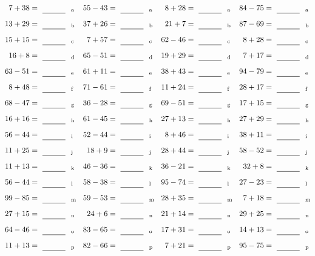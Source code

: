\documentclass
[
  draft    = true,
  fontsize = 11pt,
  parskip  = half-
]
{scrartcl}
\begin{document}
\clearpage
\begin{align*}
    \pline{7+38}&=\rline{a}
  & \pline{55-43}&=\rline{a}
  & \pline{8+28}&=\rline{a}
  & \pline{84-75}&=\rline{a} \\[1ex]
    \pline{13+29}&=\rline{b}
  & \pline{37+26}&=\rline{b}
  & \pline{21+7}&=\rline{b}
  & \pline{87-69}&=\rline{b} \\[1ex]
    \pline{15+15}&=\rline{c}
  & \pline{7+57}&=\rline{c}
  & \pline{62-46}&=\rline{c}
  & \pline{8+28}&=\rline{c} \\[1ex]
    \pline{16+8}&=\rline{d}
  & \pline{65-51}&=\rline{d}
  & \pline{19+29}&=\rline{d}
  & \pline{7+17}&=\rline{d} \\[1ex]
    \pline{63-51}&=\rline{e}
  & \pline{61+11}&=\rline{e}
  & \pline{38+43}&=\rline{e}
  & \pline{94-79}&=\rline{e} \\[1ex]
    \pline{8+48}&=\rline{f}
  & \pline{71-61}&=\rline{f}
  & \pline{11+24}&=\rline{f}
  & \pline{28+17}&=\rline{f} \\[1ex]
    \pline{68-47}&=\rline{g}
  & \pline{36-28}&=\rline{g}
  & \pline{69-51}&=\rline{g}
  & \pline{17+15}&=\rline{g} \\[1ex]
    \pline{16+16}&=\rline{h}
  & \pline{61-45}&=\rline{h}
  & \pline{27+13}&=\rline{h}
  & \pline{27+29}&=\rline{h} \\[1ex]
    \pline{56-44}&=\rline{i}
  & \pline{52-44}&=\rline{i}
  & \pline{8+46}&=\rline{i}
  & \pline{38+11}&=\rline{i} \\[1ex]
    \pline{11+25}&=\rline{j}
  & \pline{18+9}&=\rline{j}
  & \pline{28+44}&=\rline{j}
  & \pline{58-52}&=\rline{j} \\[1ex]
    \pline{11+13}&=\rline{k}
  & \pline{46-36}&=\rline{k}
  & \pline{36-21}&=\rline{k}
  & \pline{32+8}&=\rline{k} \\[1ex]
    \pline{56-44}&=\rline{l}
  & \pline{58-38}&=\rline{l}
  & \pline{95-74}&=\rline{l}
  & \pline{27-23}&=\rline{l} \\[1ex]
    \pline{99-85}&=\rline{m}
  & \pline{59-53}&=\rline{m}
  & \pline{28+35}&=\rline{m}
  & \pline{7+18}&=\rline{m} \\[1ex]
    \pline{27+15}&=\rline{n}
  & \pline{24+6}&=\rline{n}
  & \pline{21+14}&=\rline{n}
  & \pline{29+25}&=\rline{n} \\[1ex]
    \pline{64-46}&=\rline{o}
  & \pline{83-65}&=\rline{o}
  & \pline{17+31}&=\rline{o}
  & \pline{14+13}&=\rline{o} \\[1ex]
    \pline{11+13}&=\rline{p}
  & \pline{82-66}&=\rline{p}
  & \pline{7+21}&=\rline{p}
  & \pline{95-75}&=\rline{p}
\end{align*}
\end{document}
